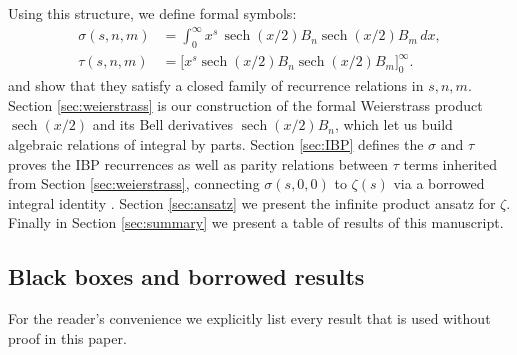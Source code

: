 \documentclass[article]{article}
\theoremstyle{plain}
\theoremstyle{definition}
\DeclareMathOperator{\sech}{sech}
\begin{document}
Using this structure, we define formal symbols:
\begin{align*}
\sigma(s,n,m) &= \int_{0}^{\infty} x^{s}\,\sech(x/2) B_{n}\sech(x/2) B_{m}\,dx,
\\
\tau(s,n,m) &= \bigl[x^{s}\sech(x/2) B_{n}\sech(x/2) B_{m}\bigr]_{0}^{\infty}.
\end{align*}
and show that they satisfy a closed family of recurrence relations in $s,n,m$.
Section \ref{sec:weierstrass} is our construction of the formal Weierstrass product $\sech(x/2)$ and its Bell derivatives $\sech(x/2) B_n$, which let us build algebraic relations of integral by parts.
Section \ref{sec:IBP} defines the $\sigma$ and $\tau$ proves the IBP recurrences as well as parity relations between $\tau$ terms inherited from Section \ref{sec:weierstrass}, connecting $\sigma(s,0,0)$ to $\zeta(s)$ via a borrowed integral identity \cite{Titchmarsh1986}.
Section \ref{sec:ansatz} we present the infinite product ansatz for $\zeta$.
Finally in Section \ref{sec:summary} we present a table of results of this manuscript. 
\subsection{Black boxes and borrowed results}\label{sec:blackboxes}

For the reader's convenience we explicitly list every result that is used without
proof in this paper.
\end{document}
